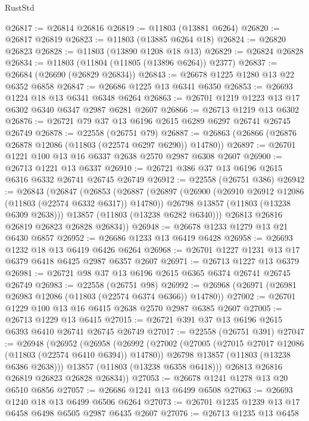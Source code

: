 \begin{lexlean}{RustStd}
\begin{coremodule}
@26817 := @26814 @26816
@26819 := @11803 (@13881 @6264)
@26820 := @26817 @26819
@26823 := @11803 (@13885 @6264 @18)
@26824 := @26820 @26823
@26828 := @11803 (@13890 @1208 @18 @13)
@26829 := @26824 @26828
@26834 := @11803 (@11804 (@11805 (@13896 @6264)) @2377)
@26837 := @26684 (@26690 (@26829 @26834))
@26843 := @26678 @1225 @1280 @13 @22 @6352 @6858
@26847 := @26686 @1225 @13 @6341 @6350
@26853 := @26693 @1224 @18 @13 @6341 @6348 @6264
@26863 := @26701 @1219 @1223 @13 @17 @6302 @6340 @6347 @2987 @6281 @2607
@26866 := @26713 @1219 @13 @6302
@26876 := @26721 @79 @37 @13 @6196 @2615 @6289 @6297 @26741 @26745 @26749
@26878 := @22558 (@26751 @79)
@26887 := @26863 (@26866 (@26876 @26878 @12086 (@11803 (@22574 @6297 @6290)) @14780))
@26897 := @26701 @1221 @100 @13 @16 @6337 @2638 @2570 @2987 @6308 @2607
@26900 := @26713 @1221 @13 @6337
@26910 := @26721 @386 @37 @13 @6196 @2615 @6316 @6332 @26741 @26745 @26749
@26912 := @22558 (@26751 @386)
@26942 := @26843
    (@26847
      (@26853
        (@26887
          (@26897
            (@26900 (@26910 @26912 @12086 (@11803 (@22574 @6332 @6317)) @14780))
            @26798
            @13857
            (@11803 (@13238 @6309 @2638)))
          @13857
          (@11803 (@13238 @6282 @6340)))
        @26813
        @26816
        @26819
        @26823
        @26828
        @26834))
@26948 := @26678 @1233 @1279 @13 @21 @6430 @6857
@26952 := @26686 @1233 @13 @6419 @6428
@26958 := @26693 @1232 @18 @13 @6419 @6426 @6264
@26968 := @26701 @1227 @1231 @13 @17 @6379 @6418 @6425 @2987 @6357 @2607
@26971 := @26713 @1227 @13 @6379
@26981 := @26721 @98 @37 @13 @6196 @2615 @6365 @6374 @26741 @26745 @26749
@26983 := @22558 (@26751 @98)
@26992 := @26968 (@26971 (@26981 @26983 @12086 (@11803 (@22574 @6374 @6366)) @14780))
@27002 := @26701 @1229 @100 @13 @16 @6415 @2638 @2570 @2987 @6385 @2607
@27005 := @26713 @1229 @13 @6415
@27015 := @26721 @391 @37 @13 @6196 @2615 @6393 @6410 @26741 @26745 @26749
@27017 := @22558 (@26751 @391)
@27047 := @26948
    (@26952
      (@26958
        (@26992
          (@27002
            (@27005 (@27015 @27017 @12086 (@11803 (@22574 @6410 @6394)) @14780))
            @26798
            @13857
            (@11803 (@13238 @6386 @2638)))
          @13857
          (@11803 (@13238 @6358 @6418)))
        @26813
        @26816
        @26819
        @26823
        @26828
        @26834))
@27053 := @26678 @1241 @1278 @13 @20 @6510 @6856
@27057 := @26686 @1241 @13 @6499 @6508
@27063 := @26693 @1240 @18 @13 @6499 @6506 @6264
@27073 := @26701 @1235 @1239 @13 @17 @6458 @6498 @6505 @2987 @6435 @2607
@27076 := @26713 @1235 @13 @6458

\end{coremodule}
\end{lexlean}
